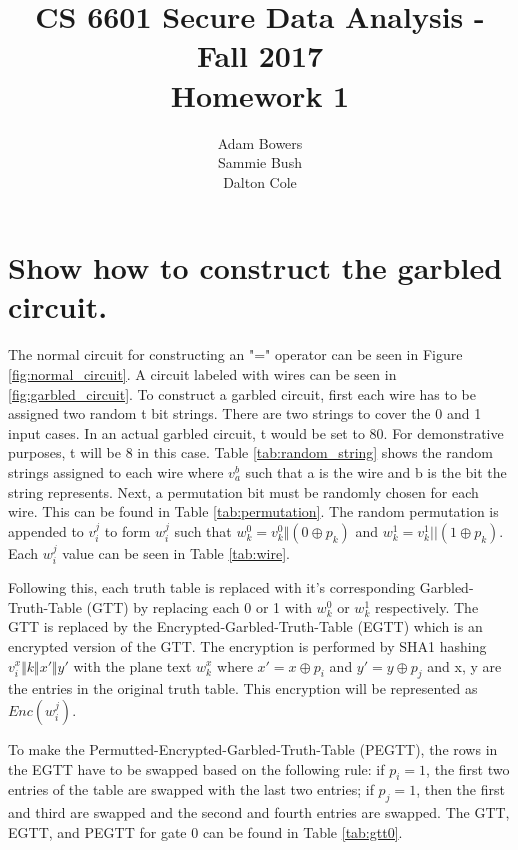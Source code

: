 \documentclass[times]{article}
\begin{document}
	\title{CS 6601 Secure Data Analysis - Fall 2017 \\ Homework 1}
	\author{Adam Bowers \\ Sammie Bush \\ Dalton Cole}
	\date{}
	\maketitle

	\section{Show how to construct the garbled circuit.}
	The normal circuit for constructing an "=" operator can be seen in Figure \ref{fig:normal_circuit}. A circuit labeled with wires can be seen in \ref{fig:garbled_circuit}. To construct a garbled circuit, first each wire has to be assigned two random t bit strings. There are two strings to cover the 0 and 1 input cases. In an actual garbled circuit, t would be set to 80. For demonstrative purposes, t will be 8 in this case. Table \ref{tab:random_string} shows the random strings assigned to each wire where $v_a^b$ such that a is the wire and b is the bit the string represents. Next, a permutation bit must be randomly chosen for each wire. This can be found in Table \ref{tab:permutation}. The random permutation is appended to $v_i^j$ to form $w_i^j$ such that $w_k^0 = v_k^0 \Vert (0 \oplus p_k)$ and $w_k^1 = v_k^1 || (1 \oplus p_k)$. Each $w_i^j$ value can be seen in Table \ref{tab:wire}. 

	Following this, each truth table is replaced with it's corresponding Garbled-Truth-Table (GTT) by replacing each 0 or 1 with $w_k^0$ or $w_k^1$ respectively. The GTT is replaced by the Encrypted-Garbled-Truth-Table (EGTT) which is an encrypted version of the GTT. The encryption is performed by SHA1 hashing $v_i^x \Vert k \Vert x' \Vert y'$ with the plane text $w_k^x$ where $x' = x \oplus p_i$ and  $y' = y \oplus p_j$ and x, y are the entries in the original truth table. This encryption will be represented as $Enc(w_i^j)$. 

	To make the Permutted-Encrypted-Garbled-Truth-Table (PEGTT), the rows in the EGTT have to be swapped based on the following rule: if $p_i = 1$, the first two entries of the table are swapped with the last two entries; if $p_j = 1$, then the first and third are swapped and the second and fourth entries are swapped. The GTT, EGTT, and PEGTT for gate 0 can be found in Table \ref{tab:gtt0}. %
	
\end{document}
